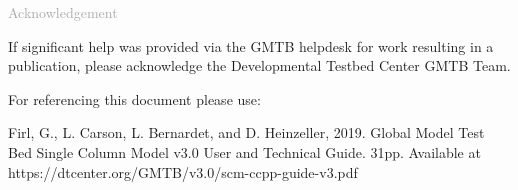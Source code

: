 \begin{titlepage}
\vspace*{0.5cm}
\noindent

\begin{flushleft}
\textcolor{darkgray}{\LARGE Acknowledgement}
\vspace*{1cm}\par

If significant help was provided via the GMTB helpdesk for work resulting in a publication, please acknowledge the Developmental Testbed Center GMTB Team.\\
\vspace*{1cm}\par
For referencing this document please use:\\
\vspace*{1cm}\par
Firl, G., L. Carson, L. Bernardet, and D. Heinzeller, 2019. Global Model Test Bed Single Column Model v3.0 User and Technical Guide. 31pp. Available at https://dtcenter.org/GMTB/v3.0/scm-ccpp-guide-v3.pdf

\end{flushleft}
\end{titlepage}
\pagebreak{}
